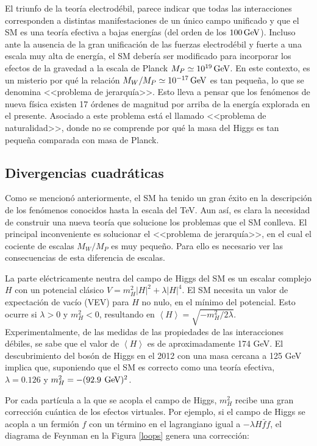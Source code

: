 El triunfo de la teoría electrodébil, parece indicar que todas las interacciones corresponden a distintas manifestaciones de un único campo unificado y que el SM es una teoría efectiva a bajas energías (del orden de los $100\, \mathrm{GeV}$). Incluso ante la ausencia de la gran unificación de las fuerzas electrodébil y fuerte a una escala muy alta de energía, el SM debería ser modificado para incorporar los efectos de la gravedad a la escala de Planck $M_{P} \simeq 10^{19} \, \mathrm{GeV}$. En este contexto, es un misterio por qué la relación $M_{W}/M_{P} \simeq 10^{-17} \, \mathrm{GeV}$ es tan pequeña, lo que se denomina <<problema de jerarquía>>\cite{PhysRevD.14.1667}. Esto lleva a pensar que los fenómenos de nueva física existen 17 órdenes de magnitud por arriba de la energía explorada en el presente. Asociado a este problema está el llamado <<problema de naturalidad>>, donde no se comprende por qué la masa del Higgs es tan pequeña comparada con masa de Planck.


\subsection{Divergencias cuadráticas}

Como se mencionó anteriormente, el SM ha tenido un gran éxito en la descripción de los fenómenos conocidos hasta la escala del TeV. Aun así, es clara la necesidad de construir una nueva teoría que solucione los problemas que el SM conlleva. El principal inconveniente es solucionar el <<problema de jerarquía>>, en el cual el cociente de escalas $M_{W}/M_{P}$ es muy pequeño. Para ello es necesario ver las consecuencias de esta diferencia de escalas.

La parte eléctricamente neutra del campo de Higgs del SM es un escalar complejo $H$ con un potencial clásico $V=m_{H}^{2}|H|^{2}+\lambda|H|^{4}$. El SM necesita un valor de expectación de vacío (VEV) para $H$ no nulo, en el mínimo del potencial. Esto ocurre si $\lambda >0$ y $m_{H}^{2}<0$, resultando en $\left\langle H \right\rangle = \sqrt{-m_{H}^{2}/2\lambda}$. Experimentalmente, de las medidas de las propiedades de las interacciones débiles, se sabe que el valor de $\left\langle H \right\rangle$ es de aproximadamente 174 GeV. El descubrimiento del bosón de Higgs en el 2012 con una masa cercana a 125 GeV implica que, suponiendo que el SM es correcto como una teoría efectiva, $\lambda = 0.126$ y $m_{H}^{2}=-(92.9\: \, \mathrm{GeV})^{2}$.

Por cada partícula a la que se acopla el campo de Higgs, $m_{H}^{2}$ recibe una gran corrección cuántica de los efectos virtuales. Por ejemplo, si el campo de Higgs se acopla a un fermión $f$ con un término en el lagrangiano igual a $-\lambda H\bar{f}f$, el diagrama de Feynman en la Figura \ref{loops} genera una corrección:

